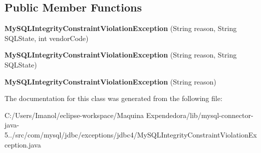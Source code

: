 \subsection*{Public Member Functions}
\begin{DoxyCompactItemize}
\item 
\mbox{\label{classcom_1_1mysql_1_1jdbc_1_1exceptions_1_1jdbc4_1_1_my_s_q_l_integrity_constraint_violation_exception_aade3a11817a32e0735ea7f5ec7972f56}} 
{\bfseries My\+S\+Q\+L\+Integrity\+Constraint\+Violation\+Exception} (String reason, String S\+Q\+L\+State, int vendor\+Code)
\item 
\mbox{\label{classcom_1_1mysql_1_1jdbc_1_1exceptions_1_1jdbc4_1_1_my_s_q_l_integrity_constraint_violation_exception_ab5af3cec2d8ae28baec304da23f4845a}} 
{\bfseries My\+S\+Q\+L\+Integrity\+Constraint\+Violation\+Exception} (String reason, String S\+Q\+L\+State)
\item 
\mbox{\label{classcom_1_1mysql_1_1jdbc_1_1exceptions_1_1jdbc4_1_1_my_s_q_l_integrity_constraint_violation_exception_abcc9a0b7af4c9d933d6e2b80d89bcaff}} 
{\bfseries My\+S\+Q\+L\+Integrity\+Constraint\+Violation\+Exception} (String reason)
\end{DoxyCompactItemize}


The documentation for this class was generated from the following file\+:\begin{DoxyCompactItemize}
\item 
C\+:/\+Users/\+Imanol/eclipse-\/workspace/\+Maquina Expendedora/lib/mysql-\/connector-\/java-\/5../src/com/mysql/jdbc/exceptions/jdbc4/My\+S\+Q\+L\+Integrity\+Constraint\+Violation\+Exception.\+java\end{DoxyCompactItemize}

